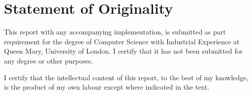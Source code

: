 \section{Statement of Originality}
This report with any accompanying implementation, is submitted as part requirement for the degree of
Computer Science with Industrial Experience at Queen Mary, University of London. I certify that it
has not been submitted for any degree or other purposes.

I certify that the intellectual content of this report, to the best of my knowledge, is the product
of my own labour except where indicated in the text.


